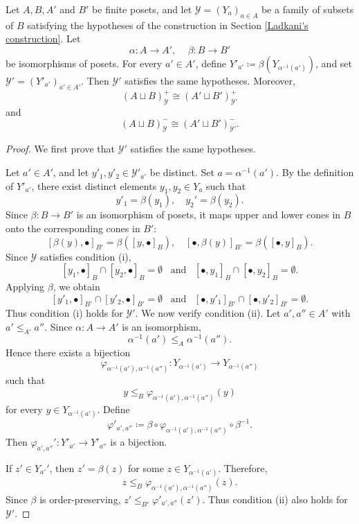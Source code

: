 \begin{proposition} \label{invgen}
    Let $A, B, A'$ and $B'$ be finite posets, and let $\mathcal{Y}=(Y_a)_{a \in A}$ be a family of subsets of $B$ satisfying the hypotheses of the construction in Section \ref{Ladkani's construction}. Let
    \[\alpha \colon A \to A', \,\,\,\,\,\,\, \beta \colon  B \to B'\] be isomorphisms of posets. 
    For every $a' \in A'$, define $Y'_{a'} \coloneq \beta (Y_{\alpha^{-1}(a')})$, and set $\mathcal{Y'}=(Y'_{a'})_{a' \in A'}$. 
    Then $\mathcal{Y}'$ satisfies the same hypotheses. Moreover,
    \[(A \sqcup B ) _{\mathcal{Y}}^+\cong (A' \sqcup B' )_{\mathcal{Y}'}^+\] and \[(A \sqcup B) _{\mathcal{Y}}^- \cong (A' \sqcup B')_{\mathcal{Y}'}^-.\]
\end{proposition}
\begin{proof}
    We first prove that $\mathcal{Y}'$ satisfies the same hypotheses.
    
    Let $a' \in A'$, and let $y'_1,y'_2 \in \mathcal{Y}'_{a'}$ be distinct. Set $a=\alpha^{-1}(a')$. By the definition of $Y'_{a'}$, there exist distinct elements $y_1,y_2 \in Y_a$ such that \[y'_1=\beta(y_1), \,\,\,\,\,\, y_2'=\beta(y_2).\]
    Since $\beta \colon B \to B'$ is an isomorphism of posets, it maps upper and lower cones in $B$ onto the corresponding cones in $B'$: 
    \[[\beta(y), \bullet]_{B'}=\beta([y,\bullet]_B), \,\,\,\,\,\, [\bullet, \beta(y)]_{B'}=\beta([\bullet,y]_B).\]
    Since $\mathcal{Y}$ satisfies condition (i),
    \[[y_1,\bullet]_B \cap [y_2,\bullet]_B= \emptyset \,\,\, \text{ and } \,\,\, [\bullet, y_1]_B \cap [\bullet, y_2]_B= \emptyset.\]
    Applying $\beta$, we obtain 
    \[[y'_1,\bullet]_{B'} \cap [y'_2,\bullet]_{B'}= \emptyset \,\,\, \text{ and } \,\,\, [\bullet, y'_1]_{B'} \cap [\bullet, y'_2]_{B'}= \emptyset.\]
    Thus condition (i) holds for $\mathcal{Y}'.$
    We now verify condition (ii). Let $a',a'' \in A'$ with $a' \leq_{A'} a''$. Since $\alpha \colon A \to A'$ is an isomorphism,
    \[\alpha^{-1}(a') \leq_A \alpha^{-1}(a'').\] Hence there exists a bijection 
    \[\varphi_{\alpha^{-1}(a'),\alpha^{-1}(a'')} \colon Y_{\alpha^{-1}(a')} \to Y_{\alpha^{-1}(a'')}\] such that 
    \[y \leq_B \varphi_{\alpha^{-1}(a'),\alpha^{-1}(a'')}(y)\] for every $y \in Y_{\alpha^{-1}(a')}$. Define
    \[\varphi'_{a',a''} \coloneq \beta \circ \varphi_{\alpha^{-1}(a'), \alpha^{-1}(a'')} \circ \beta^{-1}.\]
    Then $\varphi_{a',a''}' \colon Y'_{a'} \to Y'_{a''}$ is a bijection.
    
    If $z' \in Y_{a'}'$, then $z'=\beta(z)$ for some $z \in Y_{\alpha^{-1}(a')}$. Therefore,
    \[z \leq_B\varphi_{\alpha^{-1}(a'),\alpha^{-1}(a'')}(z).\] Since $\beta$ is order-preserving, $z' \leq_{B'} \varphi'_{a',a''}(z')$.
    Thus condition (ii) also holds for $\mathcal{Y}'$.


\end{proof}
